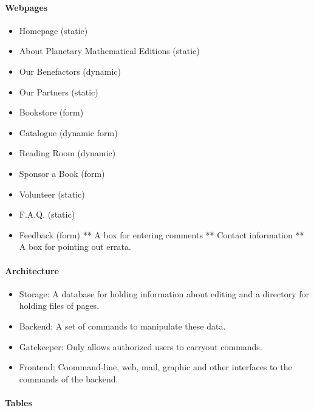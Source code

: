 \paragraph{Webpages}

\begin{itemize}
\item
  Homepage (static)
\item
  About Planetary Mathematical Editions (static)
\item
  Our Benefactors (dynamic)
\item
  Our Partners (static)
\item
  Bookstore (form)
\item
  Catalogue (dynamic form)
\item
  Reading Room (dynamic)
\item
  Sponsor a Book (form)
\item
  Volunteer (static)
\item
  F.A.Q. (static)
\item
  Feedback (form) ** A box for entering comments ** Contact information
  ** A box for pointing out errata.
\end{itemize}

\paragraph{Architecture}

\begin{itemize}
\item
  Storage: A database for holding information about editing and a
  directory for holding files of pages.
\item
  Backend: A set of commands to manipulate these data.
\item
  Gatekeeper: Only allows authorized users to carryout commands.
\item
  Frontend: Coommand-line, web, mail, graphic and other interfaces to
  the commands of the backend.
\end{itemize}

\paragraph{Tables}

